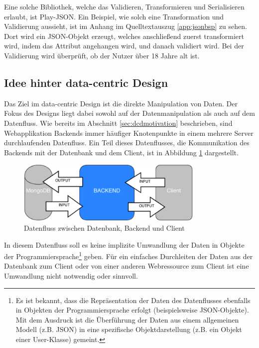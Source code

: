 Eine solche Bibliothek, welche das Validieren, Transformieren und Serialisieren erlaubt, ist Play-JSON. Ein Beispiel, wie solch eine Transformation und Validierung aussieht, ist im Anhang im Quelltextauszug \ref{app:jsonbsp} zu sehen. Dort wird ein JSON-Objekt erzeugt, welches anschließend zuerst transformiert wird, indem das Attribut  angehangen wird, und danach validiert wird. Bei der Validierung wird überprüft, ob der Nutzer über 18 Jahre alt ist.

\subsection{Idee hinter data-centric Design}
Das Ziel im data-centric Design ist die direkte Manipulation von Daten. Der Fokus des Designs liegt dabei sowohl auf der Datenmanipulation als auch auf dem Datenfluss. Wie bereits im Abschnitt \ref{sec:dcdmotivation} beschrieben, sind Webapplikation Backends immer häufiger Knotenpunkte in einem mehrere Server durchlaufenden Datenfluss. Ein Teil dieses Datenflusses, die Kommunikation des Backends mit der Datenbank und dem Client, ist in Abbildung \ref{fig:dataflow} dargestellt. 

\begin{figure}[h]   
  \centering     
  \includegraphics[width=0.8\textwidth]{img/dataflow.png}  
   \caption{Datenfluss zwischen Datenbank, Backend und Client}   
  \label{fig:dataflow} 
\end{figure}

In diesem Datenfluss soll es keine implizite Umwandlung der Daten in Objekte der Programmiersprache\footnote{Es ist bekannt, dass die Repräsentation der Daten des Datenflusses ebenfalls in Objekten der Programmiersprache erfolgt (beispielsweise JSON-Objekte). Mit dem Ausdruck ist die Überführung der Daten aus einem allgemeinen Modell (z.B. JSON) in eine spezifische Objektdarstellung (z.B. ein Objekt einer User-Klasse) gemeint.} geben. Für ein einfaches Durchleiten der Daten aus der Datenbank zum Client oder von einer anderen Webressource zum Client ist eine Umwandlung nicht notwendig oder sinnvoll. 


